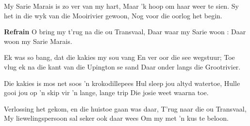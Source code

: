\footnotemark [
ititle={Sarie Marais}]


\beginverse
My Sarie Marais is zo ver van my hart,
Maar 'k hoop om haar weer te sien.
Sy het in die wyk van die Mooirivier gewoon,
Nog voor die oorlog het begin.
\endverse

\beginchorus
\textbf{Refrain}
O bring my t'rug na die ou Transvaal,
Daar waar my Sarie woon :
{Daar woon my Sarie Marais.}
\endchorus

\beginverse
Ek was so bang, dat die kakies my sou vang
En ver oor die see wegstuur;
Toe vlug ek na die kant van die Upington se sand
Daar onder langs die Grootrivier.
\endverse

\beginverse
Die kakies is mos net soos 'n krokodillepees
Hul sleep jou altyd watertoe,
Hulle gooi jou op 'n skip vir 'n lange, lange trip
Die josie weet waarna toe.
\endverse

\beginverse
Verlossing het gekom, en die huistoe gaan was daar,
T'rug naar die ou Transvaal,
My liewelingspersoon sal seker ook daar wees
Om my met 'n kus te beloon.
\endverse
\endsong